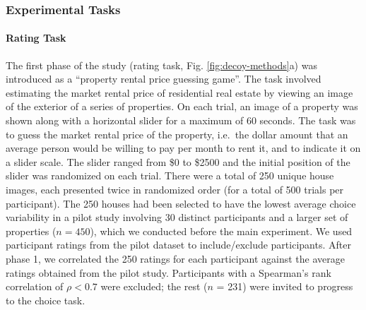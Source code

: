 \documentclass[a4paper, nobind]{templates/ociamthesis}
\begin{document}
\hypertarget{experimental-tasks}{%
\subsubsection{Experimental Tasks}\label{experimental-tasks}}

\hypertarget{rating-task}{%
\paragraph{Rating Task}\label{rating-task}}

The first phase of the study (rating task, Fig. \ref{fig:decoy-methods}a) was introduced as a ``property rental price guessing game''. The task involved estimating the market rental price of residential real estate by viewing an image of the exterior of a series of properties. On each trial, an image of a property was shown along with a horizontal slider for a maximum of 60 seconds. The task was to guess the market rental price of the property, i.e.~the dollar amount that an average person would be willing to pay per month to rent it, and to indicate it on a slider scale. The slider ranged from \$0 to \$2500 and the initial position of the slider was randomized on each trial. There were a total of 250 unique house images, each presented twice in randomized order (for a total of 500 trials per participant). The 250 houses had been selected to have the lowest average choice variability in a pilot study involving 30 distinct participants and a larger set of properties (\(n=450\)), which we conducted before the main experiment. We used participant ratings from the pilot dataset to include/exclude participants. After phase 1, we correlated the 250 ratings for each participant against the average ratings obtained from the pilot study. Participants with a Spearman's rank correlation of \(\rho< 0.7\) were excluded; the rest (\(n\) = 231) were invited to progress to the choice task.
\end{document}
